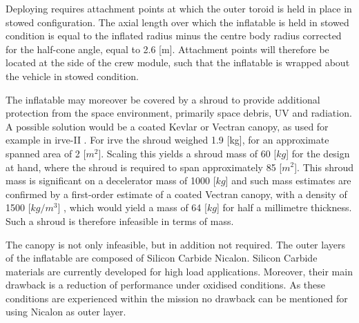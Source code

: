 Deploying requires attachment points at which the outer toroid is held in place in stowed configuration. The axial length over which the inflatable is held in stowed condition is equal to the inflated radius minus the centre body radius corrected for the half-cone angle, equal to 2.6 [m]. Attachment points will therefore be located at the side of the crew module, such that the inflatable is wrapped about the vehicle in stowed condition. 

The inflatable may moreover be covered by a shroud to provide additional protection from the space environment, primarily space debris, UV and radiation. A possible solution would be a coated Kevlar or Vectran canopy, as used for example in \gls{irve}-II \cite{Dillman2010}. For \gls{irve} the shroud weighed 1.9 [kg], for an approximate spanned area of 2 [$m^{2}$]. Scaling this yields a shroud mass of 60 [$kg$] for the design at hand, where the shroud is required to span approximately 85 [$m^{2}$]. This shroud mass is significant on a decelerator mass of 1000 [$kg$] and such mass estimates are confirmed by a first-order estimate of a coated Vectran canopy, with a density of 1500 [$kg/m^{3}$] \cite{Miller2014}, which would yield a mass of 64 [$kg$] for half a millimetre thickness. Such a shroud is therefore infeasible in terms of mass.

The canopy is not only infeasible, but in addition not required. The outer layers of the inflatable are composed of Silicon Carbide Nicalon. Silicon Carbide materials are currently developed for high load applications. Moreover, their main drawback is a reduction of performance under oxidised conditions\cite{Dutta2001}. As these conditions are experienced within the mission no drawback can be mentioned for using Nicalon as outer layer.



